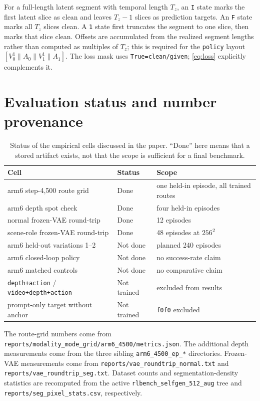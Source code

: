 \documentclass{article}
\newcommand{\code}[1]{\texttt{#1}}
\newcommand{\concat}{\mathbin{\|}}
\begin{document}
For a full-length latent segment with temporal length $T_z$, an \code{I} state marks the first
latent slice as clean and leaves $T_z-1$ slices as prediction targets. An \code{F} state marks all
$T_z$ slices clean. A \code{1} state first truncates the segment to one slice, then marks that
slice clean. Offsets are accumulated from the realized segment lengths rather than computed as
multiples of $T_z$; this is required for the \code{policy} layout
$[V_0^{1}\concat A_0\concat V_1^{1}\concat A_1]$. The loss mask uses
\code{True=clean/given}; \eqref{eq:loss} explicitly complements it.

\section{Evaluation status and number provenance}
\label{app:provenance}

\begin{table}[h]
\caption{Status of the empirical cells discussed in the paper. ``Done'' here means that a stored
artifact exists, not that the scope is sufficient for a final benchmark.}
\label{tab:status}
\centering
\small
\begin{tabular}{lll}
\toprule
\textbf{Cell} & \textbf{Status} & \textbf{Scope} \\
\midrule
arm6 step-4,500 route grid & Done & one held-in episode, all trained routes \\
arm6 depth spot check & Done & four held-in episodes \\
normal frozen-VAE round-trip & Done & 12 episodes \\
scene-role frozen-VAE round-trip & Done & 48 episodes at $256^2$ \\
arm6 held-out variations 1--2 & Not done & planned 240 episodes \\
arm6 closed-loop policy & Not done & no success-rate claim \\
arm6 matched controls & Not done & no comparative claim \\
\code{depth+action} / \code{video+depth+action} & Not trained & excluded from results \\
prompt-only target without anchor & Not trained & \code{f0f0} excluded \\
\bottomrule
\end{tabular}
\end{table}

The route-grid numbers come from
\code{reports/modality\_mode\_grid/arm6\_4500/metrics.json}. The additional depth measurements
come from the three sibling \code{arm6\_4500\_ep\_*} directories. Frozen-VAE measurements come
from \code{reports/vae\_roundtrip\_normal.txt} and
\code{reports/vae\_roundtrip\_seg.txt}. Dataset counts and segmentation-density statistics are
recomputed from the active \code{rlbench\_selfgen\_512\_aug} tree and
\code{reports/seg\_pixel\_stats.csv}, respectively.
\end{document}
